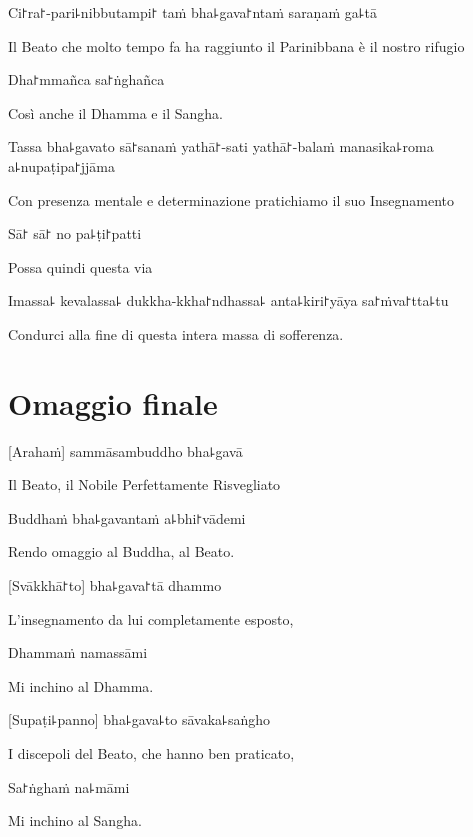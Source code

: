 Ci꜓ra꜓-pari꜕nibbutampi꜓ taṁ bha꜕gava꜓ntaṁ saraṇaṁ ga꜕tā

\begin{english}
Il Beato che molto tempo fa ha raggiunto il Parinibbana è il nostro rifugio
\end{english}

Dha꜓mmañca sa꜓ṅghañca

\begin{english}
Così anche il Dhamma e il Sangha.
\end{english}

Tassa bha꜕gavato sā꜓sanaṁ yathā꜓-sati yathā꜓-balaṁ manasika꜕roma a꜕nupaṭipa꜓jjāma

\begin{english}
Con presenza mentale e determinazione pratichiamo il suo Insegnamento
\end{english}

Sā꜓ sā꜓ no pa꜕ṭi꜓patti

\begin{english}
Possa quindi questa via
\end{english}

Imassa꜕ kevalassa꜕ dukkha-kkha꜓ndhassa꜕ anta꜕kiri꜓yāya sa꜓ṁva꜓tta꜕tu

\begin{english}
Condurci alla fine di questa intera massa di sofferenza.
\end{english}

\clearpage

\chapter{Omaggio finale}

[Arahaṁ] sammāsambuddho bha꜕gavā

\begin{english}
Il Beato, il Nobile Perfettamente Risvegliato
\end{english}

Buddhaṁ bha꜕gavantaṁ a꜕bhi꜓vādemi

\begin{english}
Rendo omaggio al Buddha, al Beato.
\end{english}

[Svākkhā꜓to] bha꜕gava꜓tā dhammo

\begin{english}
L'insegnamento da lui completamente esposto,
\end{english}

Dhammaṁ namassāmi

\begin{english}
Mi inchino al Dhamma.
\end{english}


[Supaṭi꜕panno] bha꜕gava꜕to sāvaka꜕saṅgho

\begin{english}
I discepoli del Beato, che hanno ben praticato,
\end{english}

Sa꜓ṅghaṁ na꜕māmi

\begin{english}
Mi inchino al Sangha.
\end{english}


